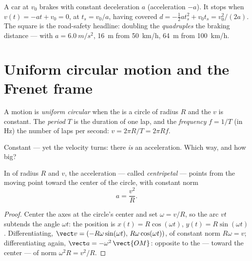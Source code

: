 \begin{example}\label{ex:g12:kinematics-2d:braking}
A car at  $v_0$ brakes with constant deceleration $a$
(acceleration $-a$). It stops when $v(t) = -a t + v_0 = 0$, at
$t_s = v_0/a$, having covered $d = -\tfrac12 a t_s^2 + v_0 t_s =
v_0^2/(2a)$. The square is the road-safety headline: doubling the
 \emph{quadruples} the braking distance --- with $a =
\qty{6.0}{m/s^2}$, \qty{16}{m} from \qty{50}{km/h}, \qty{64}{m} from
\qty{100}{km/h}.
\end{example}

\section{Uniform circular motion and the Frenet frame}

\begin{definition}\label{def:g12:kinematics-2d:ucm}
A motion is \emph{uniform circular}
when the  is a circle of radius $R$ and the  $v$ is
constant. The \emph{period} $T$ is the
duration of one lap, and the \emph{frequency} $f = 1/T$ (in \unit{Hz}) the number of laps per second:
$v = 2\pi R/T = 2\pi R f$.
\end{definition}

Constant  --- yet the velocity turns: there \emph{is} an
acceleration. Which way, and how big?

\begin{theorem}\label{thm:g12:kinematics-2d:centripetal}
%
In  of radius $R$ and  $v$, the
acceleration --- called \emph{centripetal} --- points from the moving
point toward the center of the circle, with constant norm
\[
a = \frac{v^2}{R}.
\]
\end{theorem}

\begin{proof}
Center the axes at the circle's center and set $\omega = v/R$, so the
arc $v t$ subtends the angle $\omega t$: the position is
$x(t) = R\cos(\omega t)$, $y(t) = R\sin(\omega t)$. Differentiating,
$\vect v = (-R\omega\sin(\omega t),\, R\omega\cos(\omega t))$, of
constant norm $R\omega = v$; differentiating again,
$\vect a = -\omega^2\,\vect{OM}$: opposite to the  ---
toward the center --- of norm $\omega^2 R = v^2/R$.
\end{proof}

